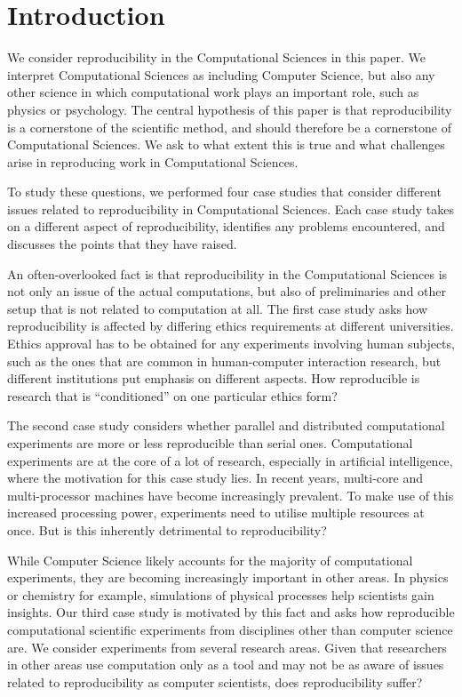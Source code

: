 \section{Introduction}
\label{s:intro}


We consider reproducibility in the Computational Sciences in this paper.  We
interpret Computational Sciences as including Computer Science, but also any
other science in which computational work plays an important role, such as
physics or psychology. The central hypothesis of this paper is that
reproducibility is a cornerstone of the scientific method, and should therefore
be a cornerstone of Computational Sciences. We ask to what extent this is true
and what challenges arise in reproducing work in Computational Sciences.

To study these questions, we performed four case studies that consider different
issues related to reproducibility in Computational Sciences.  Each case study
takes on a different aspect of reproducibility, identifies any problems
encountered, and discusses the points that they have raised.

An often-overlooked fact is that reproducibility in the Computational Sciences
is not only an issue of the actual computations, but also of preliminaries and
other setup that is not related to computation at all. The first case study asks
how reproducibility is affected by differing ethics requirements at different
universities. Ethics approval has to be obtained for any experiments involving
human subjects, such as the ones that are common in human-computer interaction
research, but different institutions put emphasis on different aspects. How
reproducible is research that is ``conditioned'' on one particular ethics form?

The second case study considers whether parallel and distributed computational
experiments are more or less reproducible than serial ones. Computational
experiments are at the core of a lot of research, especially in artificial
intelligence, where the motivation for this case study lies. In recent years,
multi-core and multi-processor machines have become increasingly prevalent. To
make use of this increased processing power, experiments need to utilise
multiple resources at once. But is this inherently detrimental to
reproducibility?

While Computer Science likely accounts for the majority of computational
experiments, they are becoming increasingly important in other areas. In physics
or chemistry for example, simulations of physical processes help scientists gain
insights. Our third case study is motivated by this fact and asks how
reproducible computational scientific experiments from disciplines other than
computer science are. We consider experiments from several research areas. Given
that researchers in other areas use computation only as a tool and may not be
as aware of issues related to reproducibility as computer scientists, does
reproducibility suffer?

